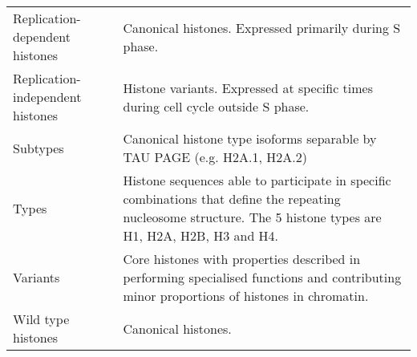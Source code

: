 \begin{table*}
\begin{tabular}{F p{\dimexpr(\textwidth--4\tabcolsep)}}
      Replication-dependent histones &
      Canonical histones. Expressed primarily during S phase. \\
      \addlinespace

      Replication-independent histones &
      Histone variants. Expressed at specific times during cell cycle outside S phase. \\
      \addlinespace

      Subtypes &
      Canonical histone type isoforms separable by TAU PAGE
      (e.g. H2A.1, H2A.2)\\
      \addlinespace

      Types &
      Histone sequences able to participate in specific combinations
      that define the repeating nucleosome structure.
      The 5 histone types are H1, H2A, H2B, H3 and H4.\\
      \addlinespace

      Variants &
      Core histones with properties described in 
      performing specialised functions and contributing minor proportions of histones in chromatin. \\
      \addlinespace

      Wild type histones &
      Canonical histones. \\
      \bottomrule
    \end{tabular}
  \end{table*}
